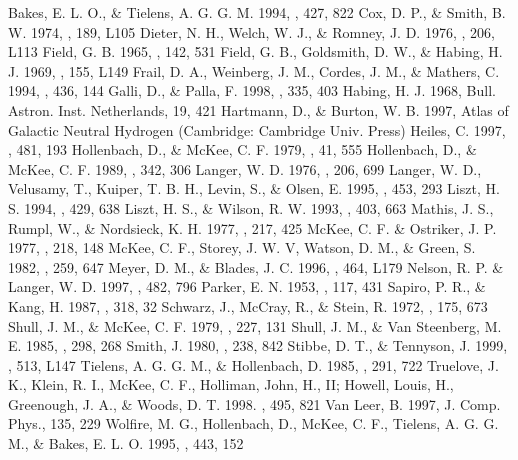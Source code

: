 
\begin{references}
Bakes, E. L. O., \& Tielens, A. G. G. M. 1994, \apj, 427, 822
Cox, D. P., \& Smith, B. W. 1974, \apjl, 189, L105
Dieter, N. H., Welch, W. J., \& Romney, J. D. 1976, \apjl, 206, L113
Field, G. B. 1965, \apj, 142, 531
Field, G. B., Goldsmith, D. W., \& Habing, H. J. 1969, \apjl, 155, L149
Frail, D. A., Weinberg, J. M., Cordes, J. M., \& Mathers, C. 1994, \apj,
436, 144
Galli, D., \& Palla, F. 1998, \aap, 335, 403 
Habing, H. J. 1968, Bull. Astron. Inst. Netherlands, 19, 421
Hartmann, D., \& Burton, W. B. 1997, Atlas of Galactic Neutral Hydrogen
(Cambridge: Cambridge Univ. Press)
Heiles, C. 1997, \apj, 481, 193
Hollenbach, D., \& McKee, C. F. 1979, \apjs, 41, 555
Hollenbach, D., \& McKee, C. F. 1989, \apj, 342, 306
Langer, W. D. 1976, \apj, 206, 699
Langer, W. D., Velusamy, T., Kuiper, T. B. H., Levin, S., \&
Olsen, E. 1995, \apj, 453, 293
Liszt, H. S. 1994, \apj, 429, 638
Liszt, H. S., \& Wilson, R. W. 1993, \apj, 403, 663
Mathis, J. S., Rumpl, W., \& Nordsieck, K. H. 1977, \apj, 217, 425
McKee, C. F. \& Ostriker, J. P. 1977, \apj, 218, 148
McKee, C. F., Storey, J. W. V, Watson, D. M., \& Green, S. 1982, \apj, 259, 647
Meyer, D. M., \& Blades, J. C. 1996, \apjl, 464, L179 
Nelson, R. P. \& Langer, W. D. 1997, \apj, 482, 796
Parker, E. N. 1953, \apj, 117, 431
Sapiro, P. R., \& Kang, H. 1987, \apj, 318, 32
Schwarz, J., McCray, R., \& Stein, R. 1972, \apj, 175, 673
Shull, J. M., \& McKee, C. F. 1979, \apj, 227, 131
Shull, J. M., \& Van Steenberg, M. E. 1985, \apj, 298, 268
Smith, J. 1980, \apj, 238, 842
Stibbe, D. T., \& Tennyson, J. 1999, \apjl, 513, L147
Tielens, A. G. G. M., \& Hollenbach, D. 1985, \apj, 291, 722
Truelove, J. K., Klein, R. I., McKee, C. F., Holliman, 
John, H., II; Howell, Louis, H., Greenough, J. A., \& Woods, D. T.
1998. \apj, 495, 821
Van Leer, B. 1997,
J. Comp. Phys., 135, 229
Wolfire, M. G., Hollenbach, D., McKee, C. F., Tielens, A. G. G. M., \& 
Bakes, E. L. O. 1995, \apj, 443, 152
\end{references}

